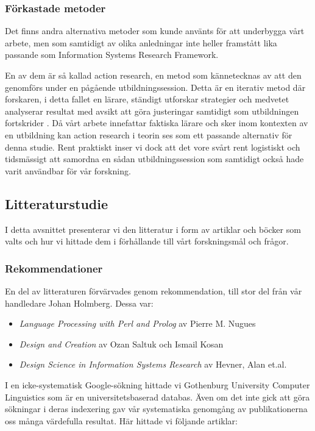 \documentclass[swedish]{maucsthesis}
\begin{document}
\subsubsection{Förkastade metoder}
Det finns andra alternativa metoder som kunde använts för att underbygga vårt
arbete, men som samtidigt av olika anledningar inte heller framstått lika
passande som Information Systems Research Framework.

En av dem är så kallad action research, en metod som kännetecknas av att den
genomförs under en pågående utbildningssession. Detta är en iterativ metod där
forskaren, i detta fallet en lärare, ständigt utforskar strategier och medvetet
analyserar resultat med avsikt att göra justeringar samtidigt som utbildningen
fortskrider \cite{clement:2004}. Då vårt arbete innefattar faktiska lärare och
sker inom kontexten av en utbildning kan action research i teorin ses som ett
passande alternativ för denna studie. Rent praktiskt inser vi dock att det vore
svårt rent logistiskt och tidsmässigt att samordna en sådan utbildningssession
som samtidigt också hade varit användbar för vår forskning.

\subsection{Litteraturstudie}\label{litteraturstudie}

I detta avsnittet presenterar vi den litteratur i form av artiklar och böcker
som valts och hur vi hittade dem i förhållande till vårt forskningsmål och
frågor.

\subsubsection{Rekommendationer}

En del av litteraturen förvärvades genom rekommendation, till stor del från vår
handledare Johan Holmberg. Dessa var:
\begin{itemize}
\item \textit{Language Processing with Perl and Prolog} av Pierre M. Nugues
\item \textit{Design and Creation} av Ozan Saltuk och Ismail Kosan
\item \textit{Design Science in Information Systems Research} av Hevner, Alan et.al.
\end{itemize}

I en icke-systematisk Google-sökning hittade vi Gothenburg University Computer
Linguistics som är en universitetsbaserad databas. Även om det inte gick att
göra sökningar i deras indexering gav vår systematiska genomgång av
publikationerna oss många värdefulla resultat. Här hittade vi följande artiklar:
\end{document}
